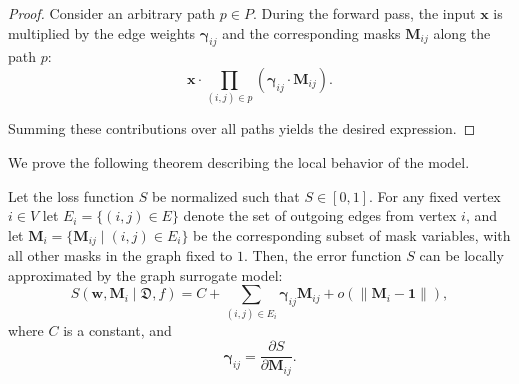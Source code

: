 \documentclass[runningheads]{llncs}
\begin{document}
\begin{proof}
Consider an arbitrary path $p \in P$. During the forward pass, the input $\mathbf{x}$ is multiplied by the edge weights $\boldsymbol{\gamma}_{ij}$ and the corresponding masks $\mathbf{M}_{ij}$ along the path $p$:
\begin{equation}
\mathbf{x} \cdot \prod_{(i,j) \in p} \left( \boldsymbol{\gamma}_{ij} \cdot \mathbf{M}_{ij} \right).
\end{equation}

Summing these contributions over all paths yields the desired expression.
\end{proof}

We prove the following theorem describing the local behavior of the model.

\begin{theorem}
Let the loss function $S$ be normalized such that $S \in [0, 1]$. For any fixed vertex $i \in V$ let $E_i = \{(i,j) \in E\}$ denote the set of outgoing edges from vertex $i$, and let $\mathbf{M}_i = \{\mathbf{M}_{ij} \mid (i,j) \in E_i\}$ be the corresponding subset of mask variables, with all other masks in the graph fixed to $1$. Then, the error function $S$ can be locally approximated by the graph surrogate model:
\begin{equation}
S(\mathbf{w}, \mathbf{M}_i \mid \mathfrak{D}, f) = C + \sum_{(i,j) \in E_i} \boldsymbol{\gamma}_{ij} \mathbf{M}_{ij} + o(\|\mathbf{M}_i - \mathbf{1}\|),
\end{equation}
where $C$ is a constant, and
\begin{equation}
\boldsymbol{\gamma}_{ij} = \frac{\partial S}{\partial \mathbf{M}_{ij}}.
\end{equation}
\end{theorem}
\end{document}
